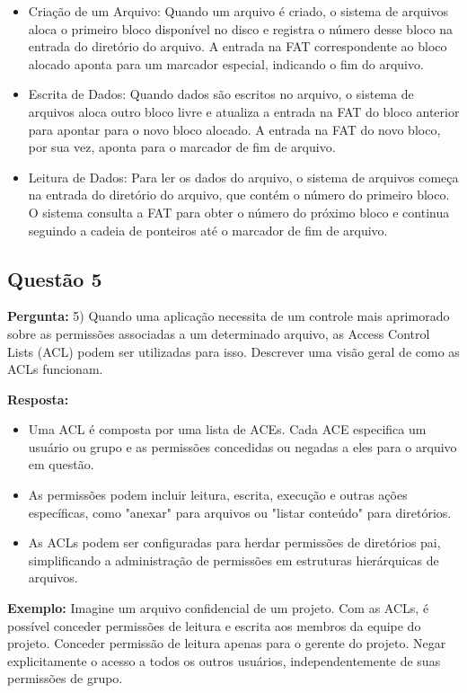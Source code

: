\documentclass{article}
\begin{document}
\begin{itemize}
  \item Criação de um Arquivo: Quando um arquivo é criado, o sistema de arquivos aloca o primeiro bloco disponível no disco e registra o número desse bloco na entrada do diretório do arquivo. A entrada na FAT correspondente ao bloco alocado aponta para um marcador especial, indicando o fim do arquivo.
  \item Escrita de Dados: Quando dados são escritos no arquivo, o sistema de arquivos aloca outro bloco livre e atualiza a entrada na FAT do bloco anterior para apontar para o novo bloco alocado. A entrada na FAT do novo bloco, por sua vez, aponta para o marcador de fim de arquivo.
  \item Leitura de Dados: Para ler os dados do arquivo, o sistema de arquivos começa na entrada do diretório do arquivo, que contém o número do primeiro bloco. O sistema consulta a FAT para obter o número do próximo bloco e continua seguindo a cadeia de ponteiros até o marcador de fim de arquivo.

\end{itemize}

\subsection{Questão 5}

\textbf{Pergunta:} 5) Quando uma aplicação necessita de um controle mais aprimorado sobre as permissões associadas a um determinado arquivo, as Access Control Lists (ACL) podem ser utilizadas para isso. Descrever uma visão geral de como as ACLs funcionam.\newline

\textbf{Resposta:} \begin{itemize}
  \item Uma ACL é composta por uma lista de ACEs. Cada ACE especifica um usuário ou grupo e as permissões concedidas ou negadas a eles para o arquivo em questão.
  \item As permissões podem incluir leitura, escrita, execução e outras ações específicas, como "anexar" para arquivos ou "listar conteúdo" para diretórios.
  \item As ACLs podem ser configuradas para herdar permissões de diretórios pai, simplificando a administração de permissões em estruturas hierárquicas de arquivos.
\end{itemize}

\textbf{Exemplo:} Imagine um arquivo confidencial de um projeto. Com as ACLs, é possível conceder permissões de leitura e escrita aos membros da equipe do projeto. Conceder permissão de leitura apenas para o gerente do projeto. Negar explicitamente o acesso a todos os outros usuários, independentemente de suas permissões de grupo.
\end{document}
